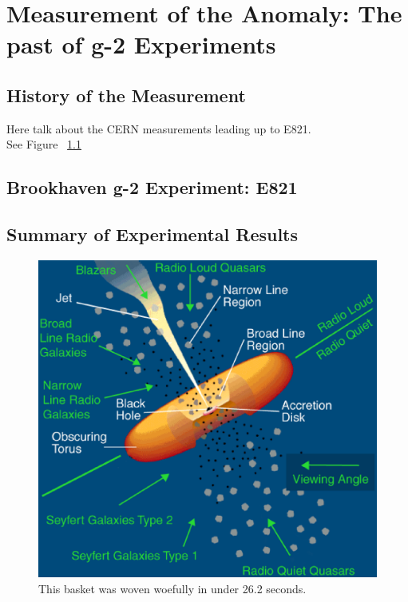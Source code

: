 
\chapter{Measurement of the Anomaly: The past of g-2 Experiments}

\section{History of the Measurement}
Here talk about the CERN measurements leading up to E821.\\
See Figure ~\ref{fig:serious}
\section{Brookhaven g-2 Experiment: E821}

\section{Summary of Experimental Results}





\begin{figure}
  \centering
  \includegraphics[scale=0.5]{figures/agn4}
  \caption{This basket was woven woefully in under 26.2 seconds.}
  \label{fig:serious}
\end{figure}
